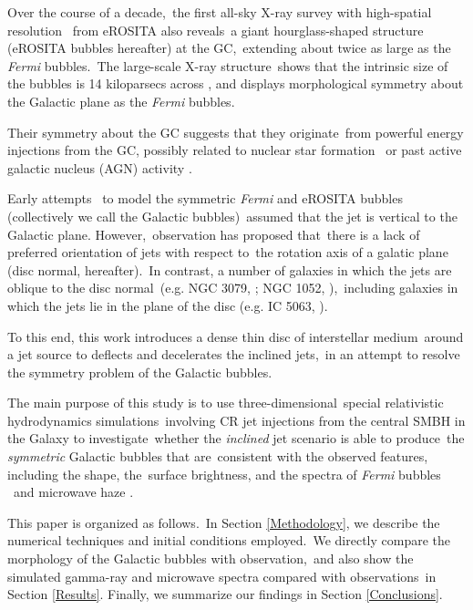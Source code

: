\documentclass[twocolumn]{aastex631}
\begin{document}
Over the course of a decade,\
the first all-sky X-ray survey with high-spatial resolution \citep{Predehl2021}\
from eROSITA \citep{Predehl2020} also reveals\
a giant hourglass-shaped structure (eROSITA bubbles hereafter) at the GC,\
extending about twice as large as the \textit{Fermi} bubbles.\
The large-scale X-ray structure\
shows that the intrinsic size of the bubbles is 14 kiloparsecs across \citep{Predehl2021},
and displays morphological symmetry about the Galactic plane as the \textit{Fermi} bubbles.

Their symmetry about the GC suggests that they originate\
from powerful energy injections from the GC, possibly related to nuclear star formation\
\citep{PhysRevLett.106.101102,Carretti2013}
or past active galactic nucleus (AGN) activity \citep{Guo2012,Yang2017}.

Early attempts \citep{Sarkar2015,Yang2017,Zhang2020}\
to model the symmetric \textit{Fermi} and eROSITA bubbles (collectively we call the Galactic bubbles)\
assumed that the jet is vertical to the Galactic plane. However,\
observation \citep{Gallimore2006} has proposed that\
there is a lack of preferred orientation of jets with respect to\
the rotation axis of a galatic plane (disc normal, hereafter).\
In contrast, a number of galaxies in which the jets are oblique to the disc normal\
(e.g. NGC 3079, \citealt{Cecil2001}; NGC 1052, \citealt{Dopita2015}),\
including galaxies in which the jets lie in the plane of the disc (e.g. IC 5063, \citealt{Morganti2015}).

To this end, this work introduces a dense thin disc of interstellar medium\
around a jet source to deflects and decelerates the inclined jets,\
in an attempt to resolve the symmetry problem of the Galactic bubbles.\

The main purpose of this study is to use three-dimensional\
special relativistic hydrodynamics simulations\
involving CR jet injections from the central SMBH in the Galaxy to investigate\
whether the \textit{inclined} jet scenario is able to produce\
the \textit{symmetric} Galactic bubbles that are\
consistent with the observed features, including the shape, the\
surface brightness, and the spectra of \textit{Fermi} bubbles \citep{Ackermann2014}\
and microwave haze \citep{Dobler_2008,PlanckCollaborationIX2013}.

This paper is organized as follows.\
In Section \ref{Methodology}, we describe the numerical techniques and initial conditions employed.\
We directly compare the morphology of the Galactic bubbles with observation,\
and also show the simulated gamma-ray and microwave spectra compared with observations\
in Section \ref{Results}.
Finally, we summarize our findings in Section \ref{Conclusions}.
\end{document}
